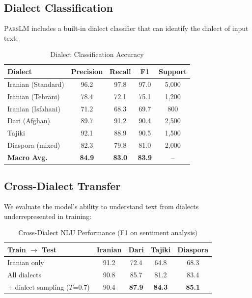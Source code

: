 \documentclass[11pt,a4paper]{article}
\newcommand{\parslm}{\textsc{ParsLM}\xspace}
\begin{document}
\subsection{Dialect Classification}

\parslm includes a built-in dialect classifier that can identify the dialect of input text:

\begin{table}[H]
\centering
\caption{Dialect Classification Accuracy}
\label{tab:dialect}
\begin{tabular}{lcccc}
\toprule
\textbf{Dialect} & \textbf{Precision} & \textbf{Recall} & \textbf{F1} & \textbf{Support} \\
\midrule
Iranian (Standard) & 96.2 & 97.8 & 97.0 & 5{,}000 \\
Iranian (Tehrani) & 78.4 & 72.1 & 75.1 & 1{,}200 \\
Iranian (Isfahani) & 71.2 & 68.3 & 69.7 & 800 \\
Dari (Afghan) & 89.7 & 91.2 & 90.4 & 2{,}500 \\
Tajiki & 92.1 & 88.9 & 90.5 & 1{,}500 \\
Diaspora (mixed) & 82.3 & 79.8 & 81.0 & 2{,}000 \\
\midrule
\textbf{Macro Avg.} & \textbf{84.9} & \textbf{83.0} & \textbf{83.9} & -- \\
\bottomrule
\end{tabular}
\end{table}

\subsection{Cross-Dialect Transfer}

We evaluate the model's ability to understand text from dialects underrepresented in training:

\begin{table}[H]
\centering
\caption{Cross-Dialect NLU Performance (F1 on sentiment analysis)}
\label{tab:cross-dialect}
\begin{tabular}{l|cccc}
\toprule
\textbf{Train $\rightarrow$ Test} & \textbf{Iranian} & \textbf{Dari} & \textbf{Tajiki} & \textbf{Diaspora} \\
\midrule
Iranian only & 91.2 & 72.4 & 64.8 & 68.3 \\
All dialects & 90.8 & 85.7 & 81.2 & 83.4 \\
+ dialect sampling ($T$=0.7) & 90.4 & \textbf{87.9} & \textbf{84.3} & \textbf{85.1} \\
\bottomrule
\end{tabular}
\end{table}
\end{document}
